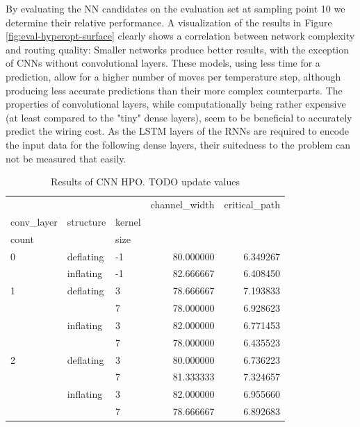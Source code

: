 By evaluating the \gls{NN} candidates on the evaluation set at sampling point 10 we determine their relative performance. A visualization of the results in Figure \ref{fig:eval-hyperopt-surface} clearly shows a correlation between network complexity and routing quality: Smaller networks produce better results, with the exception of \glspl{CNN} without convolutional layers. These models, using less time for a prediction, allow for a higher number of moves per temperature step, although producing less accurate predictions than their more complex counterparts. The properties of convolutional layers, while computationally being rather expensive (at least compared to the "tiny" dense layers), seem to be beneficial to accurately predict the wiring cost. As the \gls{LSTM} layers of the \glspl{RNN} are required to encode the input data for the following dense layers, their suitedness to the problem can not be measured that easily.

\begin{table}
	\begin{tabular}{lllrr}
		\toprule
		&           &   &  channel\_width &  critical\_path \\
		conv\_layer & structure & kernel &                &                   \\
		count &  & size &                &                   \\
		\midrule
		0 & deflating & -1 &      80.000000 &          6.349267 \\
		& inflating & -1 &      82.666667 &          6.408450 \\
		1 & deflating & 3 &      78.666667 &          7.193833 \\
		&           & 7 &      78.000000 &          6.928623 \\
		& inflating & 3 &      82.000000 &          6.771453 \\
		&           & 7 &      78.000000 &          6.435523 \\
		2 & deflating & 3 &      80.000000 &          6.736223 \\
		&           & 7 &      81.333333 &          7.324657 \\
		& inflating & 3 &      82.000000 &          6.955660 \\
		&           & 7 &      78.666667 &          6.892683 \\
		\bottomrule
	\end{tabular}
	\caption{Results of \gls{CNN} HPO. TODO update values}
	\label{table:cnn-hyperopt-results}
\end{table}

